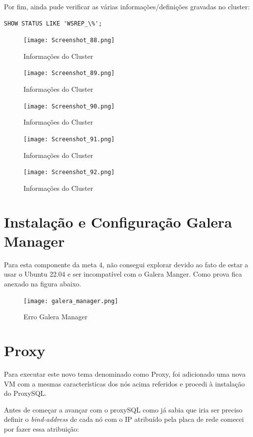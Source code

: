 \newpage
Por fim, ainda pude verificar as várias informações/definições gravadas no cluster:

\begin{verbatim}SHOW STATUS LIKE 'WSREP_\%';\end{verbatim}

\begin{figure}[H]
\center
\texttt{[image: Screenshot\_88.png]}
\caption{Informações do Cluster}
\end{figure}

\begin{figure}[H]
\center
\texttt{[image: Screenshot\_89.png]}
\caption{Informações do Cluster}
\end{figure}

\begin{figure}[H]
\center
\texttt{[image: Screenshot\_90.png]}
\caption{Informações do Cluster}
\end{figure}

\begin{figure}[H]
\center
\texttt{[image: Screenshot\_91.png]}
\caption{Informações do Cluster}
\end{figure}

\begin{figure}[H]
\center
\texttt{[image: Screenshot\_92.png]}
\caption{Informações do Cluster}
\end{figure}


\section{Instalação e Configuração Galera Manager}
Para esta componente da meta 4, não consegui explorar devido ao fato de estar a usar o Ubuntu 22.04 e ser incompatível com o Galera Manger. Como prova fica anexado na figura abaixo.

\begin{figure}[H]
\center
\texttt{[image: galera\_manager.png]}
\caption{Erro Galera Manager}
\end{figure}

\newpage
\section{Proxy}
Para executar este novo tema denominado como Proxy, foi adicionado uma nova \ac{VM} com a mesmas características dos nós acima referidos e procedi à instalação do ProxySQL.

Antes de começar a avançar com o proxySQL como já sabia que iria ser preciso definir o \textit{bind-address} de cada nó com o \ac{IP} atribuído pela placa de rede comecei por fazer essa atribuição:

